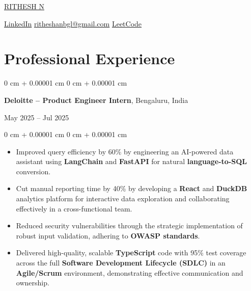 \documentclass[10pt, letterpaper]{article}
\newenvironment{highlights}{
    \begin{itemize}[
        topsep=0.10 cm,
        parsep=0.10 cm,
        partopsep=0pt,
        itemsep=0pt,
        leftmargin=0 cm + 10pt
    ]
}{
    \end{itemize}
} %
\newenvironment{onecolentry}{
    \begin{adjustwidth}{
        0 cm + 0.00001 cm
    }{
        0 cm + 0.00001 cm
    }
}{
    \end{adjustwidth}
} %
\newenvironment{twocolentry}[2][]{
    \onecolentry
    \def\secondColumn{#2}
    \setcolumnwidth{\fill, 4.5 cm}
    \begin{paracol}{2}
}{
    \switchcolumn \raggedleft \secondColumn
    \end{paracol}
    \endonecolentry
} %
\newenvironment{header}{
    \setlength{\topsep}{0pt}\par\kern\topsep\centering\linespread{1.5}
}{
    \par\kern\topsep
} %
\begin{document}
\begin{header}
    \fontsize{30}{36}\selectfont
\href{https://rithesh.engineer/}{{RITHESH N}}

    \vspace{5 pt}

    \normalsize
    \mbox{\raisebox{-0.1\height}{\Large \faLinkedin}\hspace{3pt}\href{https://www.linkedin.com/in/ritheshan/}{\textcolor{blueHighlight}{\large LinkedIn}}} \hspace{12pt}%
\mbox{\raisebox{-0.15\height}{\Large \faEnvelope}\hspace{3pt}\href{mailto:ritheshanbgl@gmail.com}{\textcolor{blueHighlight}{\large ritheshanbgl@gmail.com}}} \hspace{8pt}%
\mbox{\hspace{3pt}\href{https://leetcode.com/rithesh_n}{\textcolor{blueHighlight}{\large LeetCode}}}%
\end{header}

    \vspace{5 pt - 0.3 cm}

    \section{Professional Experience}

       \begin{twocolentry}{
    May 2025 – Jul 2025
}
    \textbf{\textcolor{blueHighlight}{\large Deloitte} – Product Engineer Intern}, Bengaluru, India
\end{twocolentry}

\vspace{0.10 cm}
\begin{onecolentry}
    \begin{highlights}
        \item Improved query efficiency by 60\% by engineering an AI-powered data assistant using \textbf{LangChain} and \textbf{FastAPI} for natural \textbf{language-to-SQL} conversion.
        \item Cut manual reporting time by 40\% by developing a \textbf{React} and \textbf{DuckDB} analytics platform for interactive data exploration and collaborating effectively in a cross-functional team.
        \item Reduced security vulnerabilities through the strategic implementation of robust input validation, adhering to \textbf{OWASP standards}.
        \item Delivered high-quality, scalable \textbf{TypeScript} code with 95\% test coverage across the full \textbf{Software Development Lifecycle (SDLC)} in an \textbf{Agile/Scrum} environment, demonstrating effective communication and ownership.
    \end{highlights}
\end{onecolentry}
\end{document}
